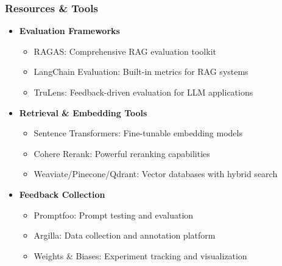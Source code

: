 {    \begin{frame}
        \frametitle{Resources \& Tools}
        \begin{itemize}
            \item \textbf{Evaluation Frameworks}
            \begin{itemize}
                \item RAGAS: Comprehensive RAG evaluation toolkit
                \item LangChain Evaluation: Built-in metrics for RAG systems
                \item TruLens: Feedback-driven evaluation for LLM applications
            \end{itemize}
            \item \textbf{Retrieval \& Embedding Tools}
            \begin{itemize}
                \item Sentence Transformers: Fine-tunable embedding models
                \item Cohere Rerank: Powerful reranking capabilities
                \item Weaviate/Pinecone/Qdrant: Vector databases with hybrid search
            \end{itemize}
            \item \textbf{Feedback Collection}
            \begin{itemize}
                \item Promptfoo: Prompt testing and evaluation
                \item Argilla: Data collection and annotation platform
                \item Weights \& Biases: Experiment tracking and visualization
            \end{itemize}
        \end{itemize}
    \end{frame}

}

